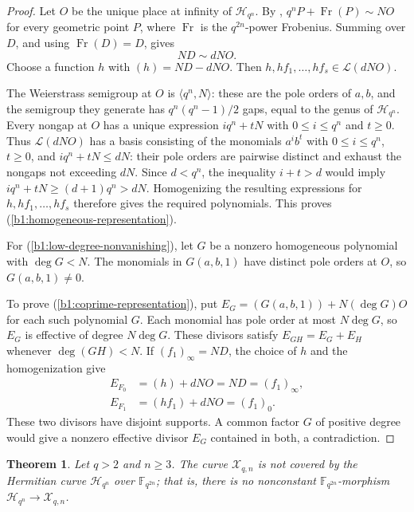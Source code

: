 \documentclass[12pt,reqno]{amsart}
\numberwithin{equation}{section}
\newcommand{\F}{\mathbb F}
\theoremstyle{plain}
\newtheorem{theorem}{Theorem}[section]
\theoremstyle{definition}
\theoremstyle{remark}
\begin{document}
\begin{proof}
Let \(O\) be the unique place at infinity of \(\mathcal H_{q^n}\).
By \cite[Corollary~1.2]{FGT1997},
\(q^nP+\operatorname{Fr}(P)\sim NO\) for every geometric point
\(P\), where \(\operatorname{Fr}\) is the \(q^{2n}\)-power
Frobenius. Summing over \(D\), and using
\(\operatorname{Fr}(D)=D\), gives
\begin{equation}
\label{b1:divisor-equivalence}
 ND\sim dNO.
\end{equation}
Choose a function \(h\) with \((h)=ND-dNO\). Then
\(h,hf_1,\ldots,hf_s\in\mathcal L(dNO)\).

The Weierstrass semigroup at \(O\) is \(\langle q^n,N\rangle\):
these are the pole orders of \(a,b\), and the semigroup they generate
has \(q^n(q^n-1)/2\) gaps, equal to the genus of \(\mathcal H_{q^n}\).
Every nongap at \(O\) has a unique expression \(iq^n+tN\) with
\(0\le i\le q^n\) and \(t\ge0\). Thus \(\mathcal L(dNO)\) has a basis consisting of the
monomials \(a^i b^t\) with \(0\le i\le q^n\), \(t\ge0\), and
\(iq^n+tN\le dN\): their pole orders are pairwise distinct and
exhaust the nongaps not exceeding \(dN\).
Since \(d<q^n\), the inequality \(i+t>d\) would imply
\(iq^n+tN\ge(d+1)q^n>dN\). Homogenizing the resulting expressions
for \(h,hf_1,\ldots,hf_s\) therefore gives the required polynomials.
This proves \textup{(\ref{b1:homogeneous-representation})}.

For \textup{(\ref{b1:low-degree-nonvanishing})}, let \(G\) be a nonzero homogeneous
polynomial with \(\deg G<N\). The monomials in \(G(a,b,1)\) have
distinct pole orders at \(O\), so \(G(a,b,1)\ne0\).

To prove \textup{(\ref{b1:coprime-representation})}, put
\(E_G=(G(a,b,1))+N(\deg G)O\) for each such polynomial \(G\).
Each monomial has pole order at most \(N\deg G\), so \(E_G\) is
effective of degree \(N\deg G\).
These divisors satisfy \(E_{GH}=E_G+E_H\)
whenever \(\deg(GH)<N\).
If \((f_1)_\infty=ND\), the choice of \(h\) and the homogenization give
\[
 \begin{aligned}
 E_{F_0}&=(h)+dNO=ND=(f_1)_\infty,\\
 E_{F_1}&=(hf_1)+dNO=(f_1)_0.
 \end{aligned}
\]
These two divisors have disjoint supports. A common factor
\(G\) of positive degree would give a nonzero effective divisor
\(E_G\) contained in both, a contradiction.
\end{proof}

\begin{theorem}
\label{b1:noncover}
Let \(q>2\) and \(n\ge3\). The curve \(\mathcal X_{q,n}\) is not
covered by the Hermitian curve \(\mathcal H_{q^n}\) over \(\F_{q^{2n}}\);
that is, there is no nonconstant \(\F_{q^{2n}}\)-morphism
\(\mathcal H_{q^n}\to\mathcal X_{q,n}\).
\end{theorem}
\end{document}
